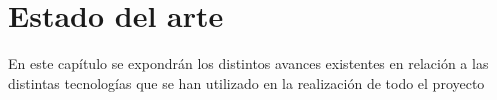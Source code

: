 \chapter{Estado del arte}
En este capítulo se expondrán los distintos avances existentes en relación a
las distintas tecnologías que se han utilizado en la realización de todo el proyecto
